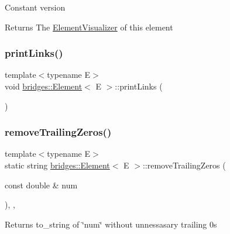 Constant version

\begin{DoxyReturn}{Returns}
The \mbox{\hyperlink{classbridges_1_1_element_visualizer}{Element\+Visualizer}} of this element 
\end{DoxyReturn}
\mbox{\label{classbridges_1_1_element_ae6f773c7222ff3a37c402e5e1f413c66}} 
\subsubsection{\texorpdfstring{print\+Links()}{printLinks()}}
{\footnotesize\ttfamily template$<$typename E$>$ \\
void \mbox{\hyperlink{classbridges_1_1_element}{bridges\+::\+Element}}$<$ E $>$\+::print\+Links (\begin{DoxyParamCaption}{ }\end{DoxyParamCaption})\hspace{0.3cm}{\ttfamily [inline]}}

\mbox{\label{classbridges_1_1_element_a0b905a076a71771a20ee4fb0ec858cfa}} 
\subsubsection{\texorpdfstring{remove\+Trailing\+Zeros()}{removeTrailingZeros()}}
{\footnotesize\ttfamily template$<$typename E$>$ \\
static string \mbox{\hyperlink{classbridges_1_1_element}{bridges\+::\+Element}}$<$ E $>$\+::remove\+Trailing\+Zeros (\begin{DoxyParamCaption}\item[{const double \&}]{num }\end{DoxyParamCaption})\hspace{0.3cm}{\ttfamily [inline]}, {\ttfamily [static]}, {\ttfamily [protected]}}

\begin{DoxyReturn}{Returns}
to\+\_\+string of \char`\"{}num\char`\"{} without unnessasary trailing 0s 
\end{DoxyReturn}
\mbox{\label{classbridges_1_1_element_a22313b74452175d07650168a701daa99}} 

